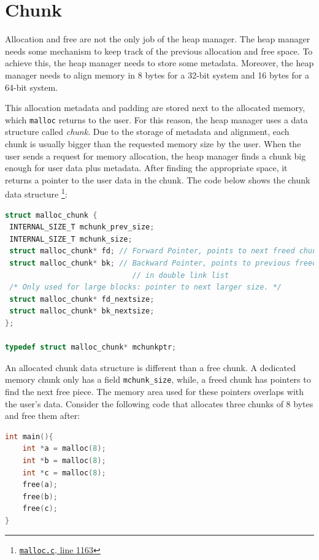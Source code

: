 \documentclass{masterthesis}
\newcommand*\mallocc{\lstinline{malloc}\xspace}
\begin{document}
\section{Chunk}
\label{sect:chunk}
Allocation and free are not the only job of the heap manager. The heap manager needs some mechanism to keep track of the previous allocation and free space. To achieve this, the heap manager needs to store some metadata. Moreover, the heap manager needs to align memory in 8 bytes for a 32-bit system and 16 bytes for a 64-bit system.

This allocation metadata and padding are stored next to the allocated memory, which \mallocc{} returns to the user. For this reason, the heap manager uses a data structure called \emph{chunk}. Due to the storage of metadata and alignment, each chunk is usually bigger than the requested memory size by the user. When the user sends a request for memory allocation, the heap manager finds a chunk big enough for user data plus metadata. After finding the appropriate space, it returns a pointer to the user data in the chunk. The code below shows the chunk data structure \footnote{\href{https://sourceware.org/git/?p=glibc.git;a=blob;f=malloc/malloc.c;\#l1163}{\texttt{malloc.c}, line 1163}}:

\begin{lstlisting}[language=c,frame=single]
struct malloc_chunk {
 INTERNAL_SIZE_T mchunk_prev_size;
 INTERNAL_SIZE_T mchunk_size;
 struct malloc_chunk* fd; // Forward Pointer, points to next freed chunk
 struct malloc_chunk* bk; // Backward Pointer, points to previous freed chunk
                             // in double link list
 /* Only used for large blocks: pointer to next larger size. */
 struct malloc_chunk* fd_nextsize;
 struct malloc_chunk* bk_nextsize;
};

typedef struct malloc_chunk* mchunkptr;
\end{lstlisting}

An allocated chunk data structure is different than a free chunk. A dedicated memory chunk only has a field \lstinline{mchunk_size}, while, a freed chunk has pointers to find the next free piece. The memory area used for these pointers overlaps with the user's data. Consider the following code that allocates three chunks of 8 bytes and free them after:

\begin{lstlisting}[language=c,frame=tlrb]
int main(){
	int *a = malloc(8);
	int *b = malloc(8);
	int *c = malloc(8);
	free(a);
	free(b);
	free(c);
}
\end{lstlisting}
\end{document}
